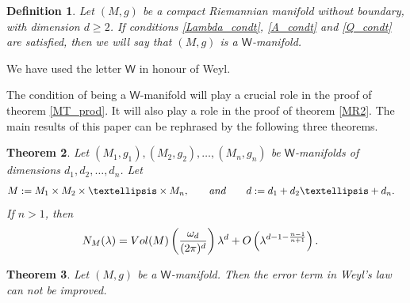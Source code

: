 \documentclass[11pt,lettersize,reqno,fullpage]{amsart}
\providecommand \hf{\hspace*{0.5cm}}
\newtheorem{thm}{Theorem}[section]
\newtheorem{defn}[thm]{Definition}
\begin{document}
\begin{defn} 
Let $(M, g)$ be a compact Riemannian manifold without boundary, with dimension $ d \geq 2$. 
If conditions \eqref{Lambda_condt}, \eqref{A_condt} and \eqref{Q_condt} are satisfied, then 
we will say that 
$(M, g)$ 
is 
a $\mathsf{W}$-manifold. 
\end{defn}
We have used the letter $\mathsf{W}$ in honour of Weyl. \\

\hf \hf The condition of being a $\mathsf{W}$-manifold 
will play a crucial role in the proof of theorem \ref{MT_prod}.  
It will also play a role in the proof of theorem \ref{MR2}.
The main results of this paper can be rephrased by the following three theorems.   

\begin{thm}
\label{main_thm_W}
Let $(M_1, g_1), (M_2, g_2), \ldots, (M_n, g_n)$ be 
$\mathsf{W}$-manifolds of dimensions $d_1, d_2, \ldots, d_n$. 
Let 
\begin{align}
M&:= M_1 \times M_2 \times \ldots \times M_n, \qquad \textnormal{and} \qquad d:= d_1 + d_2 \ldots + d_n. \nonumber
\end{align} 
If $n>1$, then 
\begin{align}
N_M(\lambda) & = \textnormal{Vol}(M)\left(\frac{\omega_d}{(2\pi)^d}\right) \lambda^d + O\left(\lambda^{d-1-\frac{n-1}{n+1}}\right). \nonumber
\end{align}
\end{thm} 

\begin{thm} 
\label{main_thm_W2_sharp}
Let $(M, g)$ be a  
$\mathsf{W}$-manifold. Then the error term in Weyl's law can not be improved.
\end{thm} 
 
\end{document}
